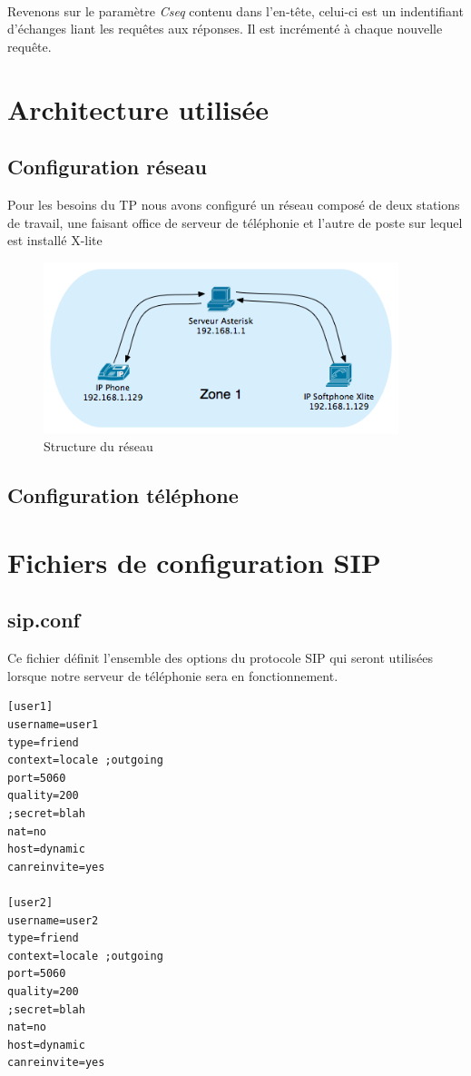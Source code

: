 \documentclass[12pt,a4paper,notitlepage]{article}
\begin{document}
\paragraph{} Revenons sur le paramètre \textit{Cseq} contenu dans l'en-tête, celui-ci est un indentifiant d'échanges liant les requêtes aux réponses. Il est incrémenté à chaque nouvelle requête.

\section{Architecture utilisée}
\subsection{Configuration réseau}
Pour les besoins du TP nous avons configuré un réseau composé de deux stations de travail, une faisant office de serveur de téléphonie et l'autre de poste sur lequel est installé X-lite

\begin{figure}[!h]
\begin{center}
\includegraphics[height=5cm]{structure_reseau}
\caption{Structure du réseau}
\label{fig:da}
\end{center}
\end{figure}

\subsection{Configuration téléphone}
\clearpage
\section{Fichiers de configuration SIP}
\subsection{sip.conf}
Ce fichier définit l'ensemble des options du protocole SIP qui seront utilisées lorsque notre serveur de téléphonie sera en fonctionnement. \\
\begin{lstlisting}[title=sip.conf v1]
[user1]
username=user1
type=friend
context=locale ;outgoing
port=5060
quality=200
;secret=blah
nat=no
host=dynamic
canreinvite=yes

[user2]
username=user2
type=friend
context=locale ;outgoing
port=5060
quality=200
;secret=blah
nat=no
host=dynamic
canreinvite=yes
\end{lstlisting}
\end{document}
